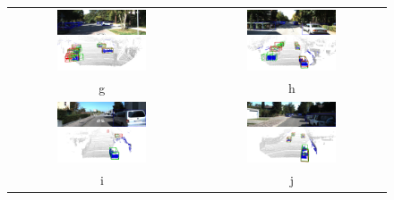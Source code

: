 \begin{figure}
    \centering
    \begin{tabular}{c c}

        \includegraphics[width=0.5\textwidth]{figures/Qualitative_examples/2.png} &
        \includegraphics[width=0.5\textwidth]{figures/Qualitative_examples/166.png} \\
        g & h \\ 
        \includegraphics[width=0.5\textwidth]{figures/Qualitative_examples/365.png}
        &
        \includegraphics[width=0.5\textwidth]{figures/Qualitative_examples/369.png}
        \\
        i & j \\
         

\end{tabular}
\end{figure}
